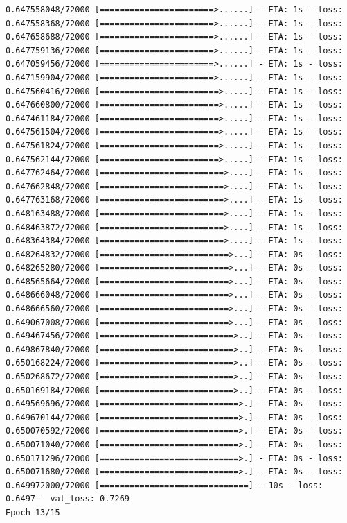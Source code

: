 \documentclass[12pt,fleqn]{article}\usepackage{../../common}
\begin{document}
\begin{verbatim}
0.647558048/72000 [=======================>......] - ETA: 1s - loss: 0.647558368/72000 [=======================>......] - ETA: 1s - loss: 0.647658688/72000 [=======================>......] - ETA: 1s - loss: 0.647759136/72000 [=======================>......] - ETA: 1s - loss: 0.647059456/72000 [=======================>......] - ETA: 1s - loss: 0.647159904/72000 [=======================>......] - ETA: 1s - loss: 0.647560416/72000 [========================>.....] - ETA: 1s - loss: 0.647660800/72000 [========================>.....] - ETA: 1s - loss: 0.647461184/72000 [========================>.....] - ETA: 1s - loss: 0.647561504/72000 [========================>.....] - ETA: 1s - loss: 0.647561824/72000 [========================>.....] - ETA: 1s - loss: 0.647562144/72000 [========================>.....] - ETA: 1s - loss: 0.647762464/72000 [=========================>....] - ETA: 1s - loss: 0.647662848/72000 [=========================>....] - ETA: 1s - loss: 0.647763168/72000 [=========================>....] - ETA: 1s - loss: 0.648163488/72000 [=========================>....] - ETA: 1s - loss: 0.648463872/72000 [=========================>....] - ETA: 1s - loss: 0.648364384/72000 [=========================>....] - ETA: 1s - loss: 0.648264832/72000 [==========================>...] - ETA: 0s - loss: 0.648265280/72000 [==========================>...] - ETA: 0s - loss: 0.648565664/72000 [==========================>...] - ETA: 0s - loss: 0.648666048/72000 [==========================>...] - ETA: 0s - loss: 0.648666560/72000 [==========================>...] - ETA: 0s - loss: 0.649067008/72000 [==========================>...] - ETA: 0s - loss: 0.649467456/72000 [===========================>..] - ETA: 0s - loss: 0.649867840/72000 [===========================>..] - ETA: 0s - loss: 0.650168224/72000 [===========================>..] - ETA: 0s - loss: 0.650268672/72000 [===========================>..] - ETA: 0s - loss: 0.650169184/72000 [===========================>..] - ETA: 0s - loss: 0.649569696/72000 [============================>.] - ETA: 0s - loss: 0.649670144/72000 [============================>.] - ETA: 0s - loss: 0.650070592/72000 [============================>.] - ETA: 0s - loss: 0.650071040/72000 [============================>.] - ETA: 0s - loss: 0.650171296/72000 [============================>.] - ETA: 0s - loss: 0.650071680/72000 [============================>.] - ETA: 0s - loss: 0.649972000/72000 [==============================] - 10s - loss: 0.6497 - val_loss: 0.7269
Epoch 13/15

\end{verbatim}
\end{document}
